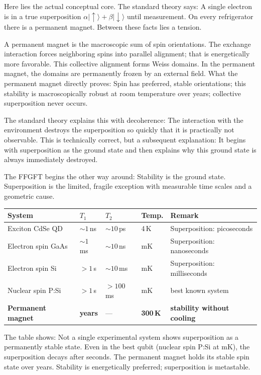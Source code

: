 Here lies the actual conceptual core. The standard theory says:
A single electron is in a true superposition
$\alpha|\uparrow\rangle+\beta|\downarrow\rangle$ until measurement. On
every refrigerator there is a permanent magnet. Between these facts
lies a tension.

A permanent magnet is the macroscopic sum of spin orientations.
The exchange interaction forces neighboring spins into parallel
alignment; that is energetically more favorable. This collective alignment
forms Weiss domains. In the permanent magnet, the domains are permanently frozen by an external field. What the permanent magnet directly proves:
Spin has preferred, stable orientations; this stability
is macroscopically robust at room temperature over years; collective
superposition never occurs.

The standard theory explains this with decoherence: The interaction with
the environment destroys the superposition so quickly that it is practically
not observable. This is technically correct, but a subsequent
explanation: It begins with superposition as the ground state and then explains
why this ground state is always immediately destroyed.

The FFGFT begins the other way around: Stability is the ground state.
Superposition is the limited, fragile exception with measurable
time scales and a geometric cause.

\begin{center}
\small
\begin{tabular}{p{3.2cm}p{1.3cm}p{1.3cm}p{1.3cm}p{2.3cm}}
\toprule
\textbf{System} & \textbf{$T_1$} & \textbf{$T_2$} & \textbf{Temp.} & \textbf{Remark} \\
\midrule
Exciton CdSe QD & $\sim1$\,ns & $\sim10$\,ps & 4\,K & Superposition: picoseconds \\
Electron spin GaAs & $\sim1$\,ms & $\sim10$\,ns & mK & Superposition: nanoseconds \\
Electron spin Si & $>1$\,s & $\sim10$\,ms & mK & Superposition: milliseconds \\
Nuclear spin P:Si & $>1$\,s & $>100$\,ms & mK & best known system \\
\textbf{Permanent magnet} & \textbf{years} & --- & \textbf{300\,K} & \textbf{stability without cooling} \\
\bottomrule
\end{tabular}
\end{center}

The table shows: Not a single experimental system shows
superposition as a permanently stable state. Even in the best qubit
(nuclear spin P:Si at mK), the superposition decays after seconds. The
permanent magnet holds its stable spin state over years. Stability
is energetically preferred; superposition is metastable.

